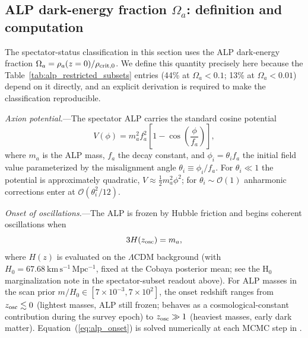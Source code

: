 \documentclass[aps,prd,twocolumn,superscriptaddress,showpacs,preprintnumbers,nofootinbib,longbibliography,floatfix]{revtex4-2}
\begin{document}
\subsection*{ALP dark-energy fraction $\Omega_a$: definition and computation}
\label{sec:p1b_omega_a_def}

The spectator-status classification in this section uses the ALP dark-energy fraction
$\Omega_a = \rho_a(z=0)/\rho_{\rm crit,0}$.
We define this quantity precisely here because the Table~\ref{tab:alp_restricted_subsets}
entries (44\% at $\Omega_a<0.1$; 13\% at $\Omega_a<0.01$) depend on it directly,
and an explicit derivation is required to make the classification reproducible.

\textit{Axion potential.}---The spectator ALP carries the standard cosine potential
\begin{equation}
V(\phi) = m_a^2 f_a^2\!\left[1 - \cos\!\left(\frac{\phi}{f_a}\right)\right],
\label{eq:alp_potential}
\end{equation}
where $m_a$ is the ALP mass, $f_a$ the decay constant, and $\phi_i = \theta_i f_a$
the initial field value parameterized by the misalignment angle $\theta_i \equiv \phi_i/f_a$.
For $\theta_i \ll 1$ the potential is approximately quadratic,
$V \approx \tfrac{1}{2}m_a^2\phi^2$; for $\theta_i\sim\mathcal{O}(1)$
anharmonic corrections enter at $\mathcal{O}(\theta_i^2/12)$.

\textit{Onset of oscillations.}---The ALP is frozen by Hubble friction and begins
coherent oscillations when
\begin{equation}
3H(z_{\rm osc}) = m_a,
\label{eq:alp_onset}
\end{equation}
where $H(z)$ is evaluated on the $\Lambda$CDM background
(with $H_0 = 67.68~\mathrm{km\,s^{-1}\,Mpc^{-1}}$, fixed at the
Cobaya posterior mean; see the H$_0$ marginalization note in the
spectator-subset readout above). For ALP masses in the scan prior
$m/H_0 \in [7\times10^{-3}, 7\times10^2]$, the onset redshift ranges from
$z_{\rm osc} \lesssim 0$ (lightest masses, ALP still frozen; behaves as a
cosmological-constant contribution during the survey epoch)
to $z_{\rm osc} \gg 1$ (heaviest masses, early dark matter).
Equation~(\ref{eq:alp_onset}) is solved numerically at each MCMC step in
.
\end{document}
